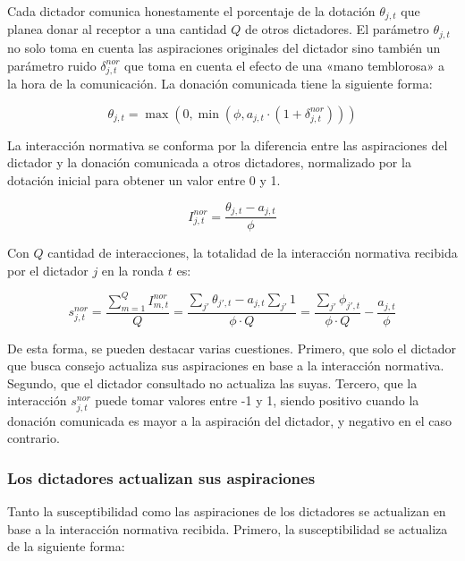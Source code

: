\documentclass[12pt,a4paper]{article}
\begin{document}
Cada dictador comunica honestamente el porcentaje de la dotación $\theta_{j,t}$ que planea donar al receptor 
a una cantidad $Q$ de otros dictadores. El parámetro $\theta_{j,t}$ no solo toma en cuenta las
aspiraciones originales del dictador sino también un parámetro ruido $\delta_{j,t}^{nor}$ que toma en
cuenta el efecto de una «mano temblorosa» a la hora de la comunicación. La donación comunicada tiene la siguiente forma:

\begin{equation}
\theta_{j,t} = \max(0,\min(\phi,a_{j,t} \cdot (1 + \delta_{j,t}^{nor})))
\end{equation}

La interacción normativa se conforma por la diferencia entre las aspiraciones del dictador y la donación
comunicada a otros dictadores, normalizado por la dotación inicial para obtener un valor entre 0 y 1.

\begin{equation}
I_{j,t}^{nor} = \frac{\theta_{j,t} - a_{j,t}}{\phi}
\end{equation}

Con $Q$ cantidad de interacciones, la totalidad de la interacción normativa recibida por el dictador $j$ en la ronda $t$ es:

\begin{equation}
s_{j,t}^{nor} = \frac{\sum_{m=1}^{Q} I_{m,t}^{nor}}{Q}  = \frac{\sum_{j'}\theta_{j',t}-a_{j,t}\sum_{j'}1}{\phi\cdot Q} = 
\frac{\sum_{j'}\phi_{j',t}}{\phi\cdot Q}-\frac{a_{j,t}}{\phi}
\end{equation}

De esta forma, se pueden destacar varias cuestiones. Primero, que solo el dictador
que busca consejo actualiza sus aspiraciones en base a la interacción normativa. Segundo,
que el dictador consultado no actualiza las suyas. Tercero, que la interacción $s_{j,t}^{nor}$ 
puede tomar valores entre -1 y 1, siendo positivo cuando la donación comunicada es mayor a la 
aspiración del dictador, y negativo en el caso contrario.

\subsubsection{Los dictadores actualizan sus aspiraciones}

Tanto la susceptibilidad como las aspiraciones de los dictadores se actualizan en base a la interacción 
normativa recibida. Primero, la susceptibilidad se actualiza de la siguiente forma:
\end{document}
